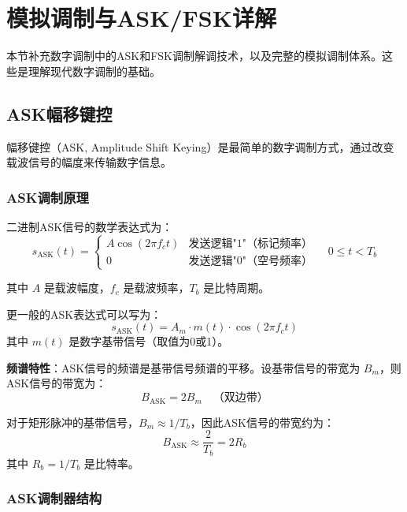 
\section{模拟调制与ASK/FSK详解}
\label{sec:analog_modulation}

本节补充数字调制中的ASK和FSK调制解调技术，以及完整的模拟调制体系。这些是理解现代数字调制的基础。

\subsection{ASK幅移键控}

幅移键控（ASK, Amplitude Shift Keying）是最简单的数字调制方式，通过改变载波信号的幅度来传输数字信息。

\subsubsection{ASK调制原理}

二进制ASK信号的数学表达式为：
\begin{equation}
    s_{\text{ASK}}(t) =
    \begin{cases}
        A\cos(2\pi f_c t) & \text{发送逻辑"1"（标记频率）} \\
        0 & \text{发送逻辑"0"（空号频率）}
    \end{cases}
    \quad 0 \leq t < T_b
\end{equation}

其中 $A$ 是载波幅度，$f_c$ 是载波频率，$T_b$ 是比特周期。

更一般的ASK表达式可以写为：
\begin{equation}
    s_{\text{ASK}}(t) = A_m \cdot m(t) \cdot \cos(2\pi f_c t)
\end{equation}
其中 $m(t)$ 是数字基带信号（取值为0或1）。

\textbf{频谱特性}：ASK信号的频谱是基带信号频谱的平移。设基带信号的带宽为 $B_m$，则ASK信号的带宽为：
\begin{equation}
    B_{\text{ASK}} = 2B_m \quad \text{（双边带）}
\end{equation}

对于矩形脉冲的基带信号，$B_m \approx 1/T_b$，因此ASK信号的带宽约为：
\begin{equation}
    B_{\text{ASK}} \approx \frac{2}{T_b} = 2R_b
\end{equation}
其中 $R_b = 1/T_b$ 是比特率。

\subsubsection{ASK调制器结构}

